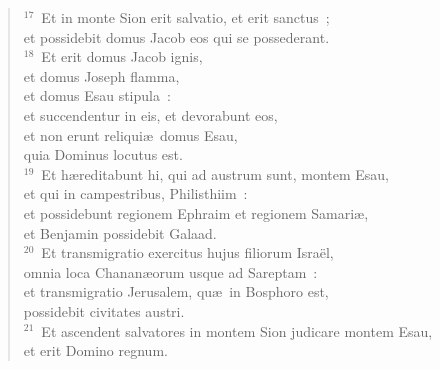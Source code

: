 \begin{verse}
${}^{17}$~Et in monte Sion erit salvatio, et erit sanctus~;\\ et possidebit domus Jacob eos qui se possederant.\\
${}^{18}$~Et erit domus Jacob ignis,\\ et domus Joseph flamma,\\ et domus Esau stipula~:\\ et succendentur in eis, et devorabunt eos,\\ et non erunt reliqui\ae\ domus Esau,\\ quia Dominus locutus est.\\
${}^{19}$~Et h\ae reditabunt hi, qui ad austrum sunt, montem Esau,\\ et qui in campestribus, Philisthiim~:\\ et possidebunt regionem Ephraim et regionem Samari\ae ,\\ et Benjamin possidebit Galaad.\\
${}^{20}$~Et transmigratio exercitus hujus filiorum Isra\"el,\\ omnia loca Chanan\ae orum usque ad Sareptam~:\\ et transmigratio Jerusalem, qu\ae\ in Bosphoro est,\\ possidebit civitates austri.\\
${}^{21}$~Et ascendent salvatores in montem Sion judicare montem Esau,\\ et erit Domino regnum.\end{verse}


